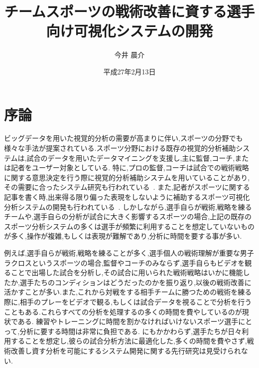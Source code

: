 \documentclass[sotsuron]{kuee}
\title{チームスポーツの戦術改善に資する選手向け可視化システムの開発}
\author{今井 晨介}
\date{平成27年2月13日}
\begin{document}
\maketitle	
\tableofcontents


\chapter{序論}
	ビッグデータを用いた視覚的分析の需要が高まりに伴い,スポーツの分野でも様々な手法が提案されている.スポーツ分野における既存の視覚的分析補助システムは,試合のデータを用いたデータマイニングを支援し,主に監督,コーチ,または記者をユーザー対象としている.
	特に,プロの監督,コーチは試合での戦術戦略に関する意思決定を行う際に視覚的分析補助システムを用いていることがあり,その需要に合ったシステム研究も行われている~\cite{SoccerStory,SnapShot,TenniVis}.
	また,記者がスポーツに関する記事を書く時,出来得る限り偏った表現をしないように補助するスポーツ可視化分析システムの開発も行われている~\cite{SoccerStory}.
	しかしながら,選手自らが戦術,戦略を練るチームや,選手自らの分析が試合に大きく影響するスポーツの場合,上記の既存のスポーツ分析システムの多くは選手が頻繁に利用することを想定していないものが多く,操作が複雑,もしくは表現が難解であり,分析に時間を要する事が多い.
	
	例えば,選手自らが戦術,戦略を練ることが多く,選手個人の戦術理解が重要な男子ラクロスというスポーツの場合,監督やコーチのみならず,選手自らもビデオを観ることで出場した試合を分析し,その試合に用いられた戦術戦略はいかに機能したか,選手たちのコンディションはどうだったのかを振り返り,以後の戦術改善に活かすことが多い.また,これから対戦をする相手チームに勝つための戦術を練る際に,相手のプレーをビデオで観る,もしくは試合データを視ることで分析を行うこともある.これらすべての分析を処理するの多くの時間を費やしているのが現状である.
	練習やトレーニングに時間を割かなければいけないスポーツ選手にとって,分析に要する時間は非常に負担である.
	にもかかわらず,選手たちが日々利用することを想定し,彼らの試合分析方法に最適化した,多くの時間を費やさず,戦術改善し資す分析を可能にするシステム開発に関する先行研究は見受けられない.
	
\end{document}
